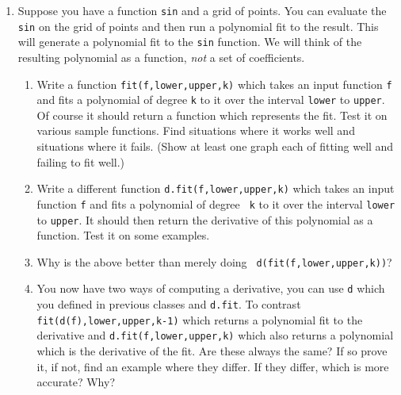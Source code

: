 \begin{enumerate}
\item Suppose you have a function {\tt sin} and a grid of points.  You
can evaluate the {\tt sin} on the grid of points and then run a
polynomial fit to the result.  This will generate a polynomial fit to
the {\tt sin} function.  We will think of the resulting polynomial as
a function, {\em not} a set of coefficients.
\begin{enumerate}
\item Write a function {\tt fit(f,lower,upper,k)} which takes an
input function {\tt f} and fits a polynomial of degree {\tt k} to it
over the interval {\tt lower} to {\tt upper}.  Of course it should
return a function which represents the fit.  Test it on various sample
functions.  Find situations where it works well and situations where
it fails.  (Show at least one graph each of fitting well and failing
to fit well.)
\item Write a different function {\tt d.fit(f,lower,upper,k)} which
takes an input function {\tt f} and fits a polynomial of degree {\tt
k} to it over the interval {\tt lower} to {\tt upper}.  It should then
return the derivative of this polynomial as a function.  Test it on
some examples.
\item Why is the above better than merely doing {\tt
d(fit(f,lower,upper,k))}?
\item You now have two ways of computing a derivative, you can use
{\tt d} which you defined in previous classes and {\tt d.fit}.  To
contrast {\tt fit(d(f),lower,upper,k-1)} which returns a polynomial fit
to the derivative and {\tt d.fit(f,lower,upper,k)} which also returns
a polynomial which is the derivative of the fit.  Are these always the
same?  If so prove it, if not, find an example where they differ.  If
they differ, which is more accurate?  Why?
\end{enumerate}
\end{enumerate}


